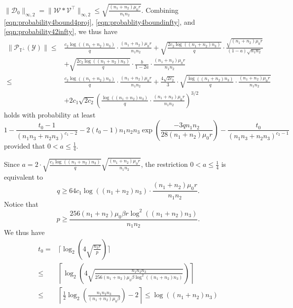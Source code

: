 \documentclass[twoside,12pt]{article}
\begin{document}
$\|\mathcal{D}_0\|_{\infty,2}=\|\mathcal{W}*\mathcal{V}^\top\|_{\infty,2}\leq\sqrt{\frac{(n_1+n_2)\mu_0r}{n_1n_2}}$. Combining \eqref{eqn:probability4bound4proj}, \eqref{eqn:probablity4boundinfty}, and \eqref{eqn:probability42infty}, we thus have
\begin{align*}
\|\mathcal{P}_{\mathbb{T}^{\perp}}\left(\mathcal{Y}\right)\|
\leq&  
 \frac{c_{2}\log((n_1+n_2)n_3)}{q}\cdot \frac{(n_1+n_2)\mu_{0}r}{n_{1}n_{2}}
    +\sqrt{\frac{2c_{2}\log((n_1+n_2)n_3)}{q}}   \cdot\frac{\sqrt{(n_1+n_2)\mu_0r}}{(1-a)\sqrt{n_1n_2}} \\
    &+\sqrt{\frac{2c_{2}\log((n_1+n_2)n_3)}{q}}  \cdot  \frac{b}{1-2a}\cdot \frac{ (n_1+n_2)\mu_{0}r}{n_{1}n_{2}}\\
    \leq &\frac{c_{2}\log((n_1+n_2)n_3)}{q}\cdot \frac{(n_1+n_2)\mu_{0}r}{n_{1}n_{2}}
    +\frac{4\sqrt{2c_2}}{3}\cdot\sqrt{\frac{\log((n_1+n_2)n_3)}{q}  \cdot\frac{ (n_1+n_2)\mu_0r}{ n_1n_2}} \\
    &+2c_1\sqrt{2c_2}\left(\frac{\log((n_1+n_2)n_3)}{q}     \cdot \frac{ (n_1+n_2)\mu_{0}r}{n_{1}n_{2}}\right)^{3/2}
\end{align*}
holds with probability at least 
\[ 1-  \frac{t_0-1}{(n_1n_3+n_2n_3)^{c_1-2}}-2(t_0-1)n_{1}n_{2}n_{3}\exp\left(\frac{-3qn_{1}n_{2}}{28(n_1+n_2)\mu_{0}r}\right)-\frac{t_0} {(n_1n_3+n_2n_3)^{c_2-1}}\] provided that  %
 {$0<a\leq \frac{1}{4}$}.

\noindent Since $a = 2\cdot\sqrt{\frac{c_1\log((n_1+n_2)n_3)}{q}} \sqrt{\frac{(n_1+n_2)\mu_{0}r}{n_{1}n_{2}}}$, the restriction  $0<a\leq \frac1 4$ is equivalent to \[q\geq 64c_1\log((n_1+n_2)n_3)\cdot\frac{(n_1+n_2)\mu_0r}{n_1n_2}.\]
Notice that
 \[
p\geq \frac{256(n_1+n_2)\mu_0\beta r\log^2((n_1+n_2)n_3)}{n_1n_2}.
\]
 We thus have
\begin{align*}
    t_0=&\lceil \log_2\left(4\sqrt{\frac{n_3r}{p}}\right) \rceil\\
    \leq&\left\lceil \log_2\left(4\sqrt{\frac{n_1n_2n_3}{256(n_1+n_2)\mu_0\beta\log^2((n_1+n_2)n_3)}}\right) \right\rceil\\
    \leq &\left\lceil \frac{1}{2}\log_2\left(  {\frac{n_1n_2n_3}{  (n_1+n_2)\mu_0\beta }}\right)-2 \right\rceil\leq  \log((n_1+n_2)n_3)
\end{align*}
 
\end{document}
